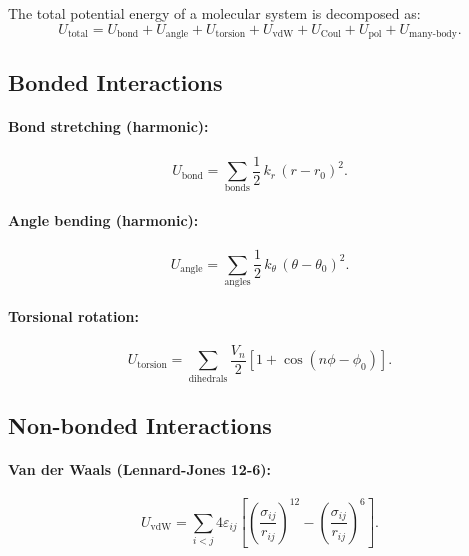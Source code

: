 \documentclass[11pt]{article}
\begin{document}
The total potential energy of a molecular system is decomposed as:
\begin{equation}
  U_\mathrm{total} = U_\mathrm{bond} + U_\mathrm{angle}
    + U_\mathrm{torsion} + U_\mathrm{vdW}
    + U_\mathrm{Coul} + U_\mathrm{pol}
    + U_\mathrm{many\text{-}body}.
  \label{eq:potential_decomposition}
\end{equation}

\subsection{Bonded Interactions}

\paragraph{Bond stretching (harmonic):}
\begin{equation}
  U_\mathrm{bond} = \sum_\mathrm{bonds} \frac{1}{2}\,k_r\,(r - r_0)^2.
\end{equation}

\paragraph{Angle bending (harmonic):}
\begin{equation}
  U_\mathrm{angle} = \sum_\mathrm{angles}
    \frac{1}{2}\,k_\theta\,(\theta - \theta_0)^2.
\end{equation}

\paragraph{Torsional rotation:}
\begin{equation}
  U_\mathrm{torsion} = \sum_\mathrm{dihedrals}
    \frac{V_n}{2}\left[1 + \cos(n\phi - \phi_0)\right].
\end{equation}

\subsection{Non-bonded Interactions}

\paragraph{Van der Waals (Lennard-Jones 12-6):}
\begin{equation}
  U_\mathrm{vdW} = \sum_{i<j} 4\varepsilon_{ij}
    \left[\left(\frac{\sigma_{ij}}{r_{ij}}\right)^{12}
    - \left(\frac{\sigma_{ij}}{r_{ij}}\right)^{6}\right].
\end{equation}
\end{document}
